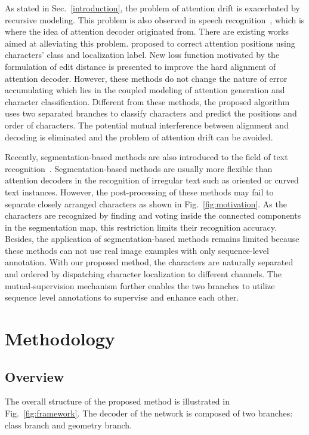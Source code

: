\documentclass[letterpaper]{article} \usepackage{aaai20}  \usepackage{times}  \usepackage{helvet} \usepackage{courier}  \usepackage[hyphens]{url}  \usepackage{graphicx} \urlstyle{rm} \def\UrlFont{\rm}  \usepackage{graphicx}  \frenchspacing  \setlength{\pdfpagewidth}{8.5in}  \setlength{\pdfpageheight}{11in}
\begin{document}
As stated in Sec.~\ref{introduction}, the problem of attention drift is exacerbated by recursive modeling. This problem is also observed in speech recognition~\cite{attention-drift}, which is where the idea of attention decoder originated from.
There are existing works aimed at alleviating this problem. \cite{cheng2017fan} proposed to correct attention positions using characters' class and localization label. New loss function motivated by the formulation of edit distance is presented\cite{bai2018edit} to improve the hard alignment of attention decoder. However, these methods do not change the nature of error accumulating which lies in the coupled modeling of attention generation and character classification. Different from these methods, the proposed algorithm uses two separated branches to classify characters and predict the positions and order of characters. The potential mutual interference between alignment and decoding is eliminated and the problem of attention drift can be avoided.

Recently, segmentation-based methods are also introduced to the field of text recognition~\cite{mask_textspotter,ca-fcn}. Segmentation-based methods are usually more flexible than attention decoders in the recognition of irregular text such as oriented or curved text instances. However, the post-processing of these methods may fail to separate closely arranged characters as shown in Fig.~\ref{fig:motivation}. As the characters are recognized by finding and voting inside the connected components in the segmentation map, this restriction limits their recognition accuracy. Besides, the application of segmentation-based methods remains limited because these methods can not use real image examples with only sequence-level annotation. With our proposed method, the characters are naturally separated and ordered by dispatching character localization to different channels. The mutual-supervision mechanism further enables the two branches to utilize sequence level annotations to supervise and enhance each other. 

\section{Methodology}

\subsection{Overview}
The overall structure of the proposed method is illustrated in Fig.~\ref{fig:framework}. The decoder of the network is composed of two branches: class branch and geometry branch.
\end{document}
